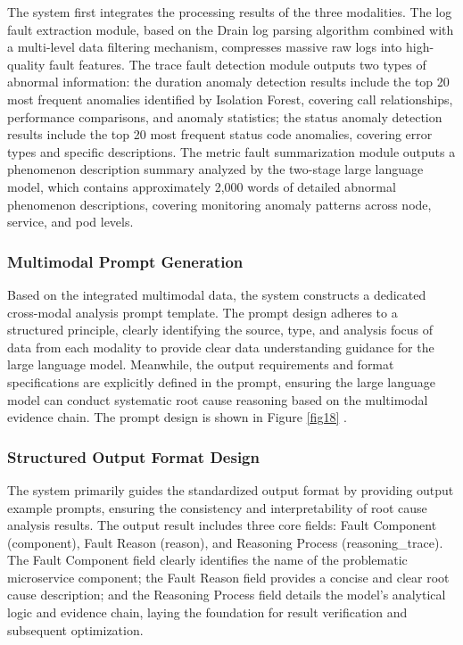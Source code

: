 \documentclass[10pt]{article}
\let\oldref\ref
\renewcommand{\ref}[1]{%
    \textcolor{blue}{\oldref{#1}}%
}
\begin{document}
The system first integrates the processing results of the three modalities. The log fault extraction module, based on the Drain log parsing algorithm combined with a multi-level data filtering mechanism, compresses massive raw logs into high-quality fault features. The trace fault detection module outputs two types of abnormal information: the duration anomaly detection results include the top 20 most frequent anomalies identified by Isolation Forest, covering call relationships, performance comparisons, and anomaly statistics; the status anomaly detection results include the top 20 most frequent status code anomalies, covering error types and specific descriptions. The metric fault summarization module outputs a phenomenon description summary analyzed by the two-stage large language model, which contains approximately 2,000 words of detailed abnormal phenomenon descriptions, covering monitoring anomaly patterns across node, service, and pod levels.

\subsubsection{Multimodal Prompt Generation}

Based on the integrated multimodal data, the system constructs a dedicated cross-modal analysis prompt template. The prompt design adheres to a structured principle, clearly identifying the source, type, and analysis focus of data from each modality to provide clear data understanding guidance for the large language model. Meanwhile, the output requirements and format specifications are explicitly defined in the prompt, ensuring the large language model can conduct systematic root cause reasoning based on the multimodal evidence chain. The prompt design is shown in Figure \ref{fig18}.

\subsubsection{Structured Output Format Design}

The system primarily guides the standardized output format by providing output example prompts, ensuring the consistency and interpretability of root cause analysis results. The output result includes three core fields: Fault Component (component), Fault Reason (reason), and Reasoning Process (reasoning\_trace). The Fault Component field clearly identifies the name of the problematic microservice component; the Fault Reason field provides a concise and clear root cause description; and the Reasoning Process field details the model’s analytical logic and evidence chain, laying the foundation for result verification and subsequent optimization.
\end{document}
